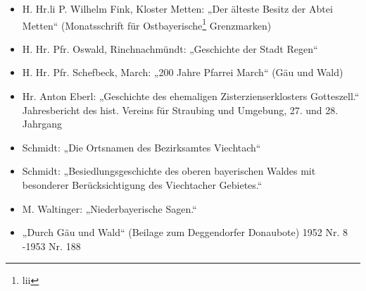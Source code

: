 \documentclass{book}
\begin{document}
\begin{itemize}
\item H. Hr.li P. Wilhelm Fink, Kloster Metten: „Der älteste Besitz der
Abtei Metten“ (Monatsschrift für Ostbayerische\footnote{lii} Grenzmarken)

\item H. Hr. Pfr. Oswald, Rinchnachmündt: „Geschichte der Stadt Regen“

\item H. Hr. Pfr. Schefbeck, March: „200 Jahre Pfarrei March“ (Gäu und
Wald)

\item Hr. Anton Eberl: „Geschichte des ehemaligen Zisterzienserklosters
Gotteszell.“ Jahresbericht des hist. Vereins für Straubing und Umgebung,
27. und
28. Jahrgang

\item Schmidt: „Die Ortsnamen des Bezirksamtes Viechtach“

\item Schmidt: „Besiedlungsgeschichte des oberen bayerischen Waldes mit
besonderer Berücksichtigung des Viechtacher Gebietes.“

\item M. Waltinger: „Niederbayerische Sagen.“

\item „Durch Gäu und Wald“ (Beilage zum Deggendorfer Donaubote) 1952 Nr.
8 -1953 Nr. 188
\end{itemize}
\end{document}

